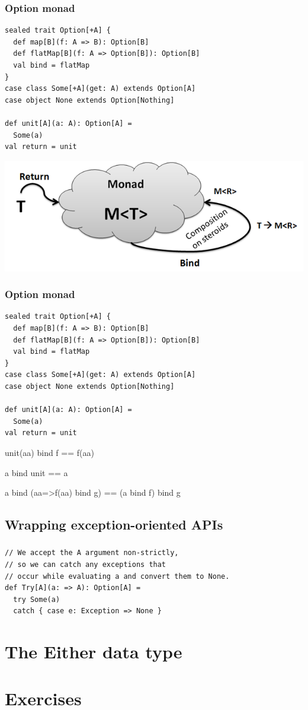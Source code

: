 \documentclass{beamer}
\begin{document}
\begin{frame}[fragile,t]
  \frametitle{Option monad}
\begin{lstlisting}
sealed trait Option[+A] {
  def map[B](f: A => B): Option[B]
  def flatMap[B](f: A => Option[B]): Option[B]
  val bind = flatMap
}
case class Some[+A](get: A) extends Option[A]
case object None extends Option[Nothing]

def unit[A](a: A): Option[A] =
  Some(a)
val return = unit
\end{lstlisting}
\begin{center}
\includegraphics[scale=.35]{monad.png}
\end{center}
\end{frame}

\begin{frame}[fragile,t]
  \frametitle{Option monad}
\begin{lstlisting}
sealed trait Option[+A] {
  def map[B](f: A => B): Option[B]
  def flatMap[B](f: A => Option[B]): Option[B]
  val bind = flatMap
}
case class Some[+A](get: A) extends Option[A]
case object None extends Option[Nothing]

def unit[A](a: A): Option[A] =
  Some(a)
val return = unit
\end{lstlisting}
{\ttfamily unit(aa) bind f == f(aa)}

{\ttfamily a bind unit == a}

{\ttfamily a bind (aa=>f(aa) bind g) == (a bind f) bind g}
\end{frame}

\subsection{Wrapping exception-oriented APIs}

\begin{frame}[fragile]
  \frametitle{\subsecname}
\begin{lstlisting}
// We accept the A argument non-strictly,
// so we can catch any exceptions that
// occur while evaluating a and convert them to None.
def Try[A](a: => A): Option[A] =
  try Some(a)
  catch { case e: Exception => None }
\end{lstlisting}
\end{frame}

\section{The Either data type}

\section{Exercises}

\begin{frame}{\secname}
\end{frame}
\end{document}
